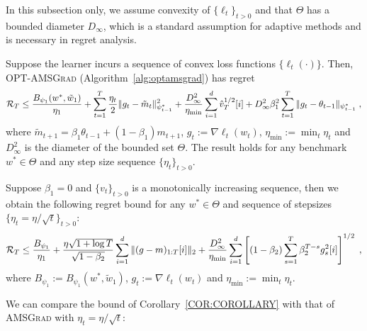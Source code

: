 \documentclass[wcp]{jmlr}
\begin{document}
In this subsection only, we assume convexity of $\{\ell_t\}_{t>0}$ and that $\Theta$ has a bounded diameter $D_{\infty}$, which is a standard assumption for adaptive methods \citep{RKK18,KB15} and is necessary in regret analysis.
\begin{Theorem} \label{THM:MAINCONVEX}\vspace{0.05in}
Suppose the learner incurs a sequence of convex loss functions $\{ \ell_{t}(\cdot) \}$.
Then,  \textsc{OPT-AMSGrad} (Algorithm~\ref{alg:optamsgrad}) has regret 
\begin{equation} \notag
\begin{split}
\mathcal{R}_T \leq    \frac{ B_{\psi_1}(w^*, \tilde{w}_{1})}{\eta_1}
+ \sum_{t=1}^T\frac{\eta_t}{2} \| g_t - \tilde{m}_t  \|_{\psi_{t-1}^*}^2 + \frac{D_{\infty}^2}{\eta_{\min}}  \sum_{i=1}^d \hat{v}_{T}^{1/2}[i] + D_{\infty}^2\beta_1^2   \sum_{t=1}^T  \| g_t - \theta_{t-1}  \|_{\psi_{t-1}^*}\eqsp,
\end{split}
\end{equation}
where $ \tilde{m}_{t+1}  = \beta_1 \theta_{t-1} +(1-\beta_1) m_{t+1}$, $g_{t}:= \nabla \ell_{t}(w_t)$, $\eta_{{\min}} := \min_{{t}} \eta_{t}$ and $D_{\infty}^2$ is the diameter of the bounded set $\Theta$.
The result holds for any benchmark $w^{*} \in \Theta$ and any step size sequence $\{ \eta_t \}_{t>0}$.
\end{Theorem}
\vspace{0.05in}
\begin{Corollary}\label{COR:COROLLARY}
Suppose $\beta_1=0$ and $\{v_t\}_{t>0}$ is a monotonically increasing sequence, then we obtain the following regret bound for any $w^{*} \in \Theta$ and sequence of stepsizes $\{ \eta_t = \eta/\sqrt{t}\}_{t>0}$: 
\begin{equation}\notag
\begin{split}
\mathcal{R}_T \leq  \frac{ B_{\psi_1}}{\eta_1}
+ \frac{\eta \sqrt{1 + \log T}}{\sqrt{1 - \beta_2}} \sum_{i=1}^d \| (g-m)_{1:T}[i] \|_2  +\frac{D_{\infty}^2}{\eta_{\min}} \sum_{i=1}^d \left[ (1-\beta_2) \sum_{s=1}^{T} \beta_2^{T-s} g^2_s[i] \right]^{1/2} \eqsp,
\end{split}
\end{equation}
where $B_{\psi_1} := B_{\psi_1}(w^*, \tilde{w}_{1})$, $g_{t}:= \nabla \ell_{t}(w_t)$ and $\eta_{{\min}} := \min_{{t}} \eta_{t}$.
\end{Corollary}
We can compare the bound of Corollary~\ref{COR:COROLLARY} with that of \textsc{AMSGrad} \citep{RKK18} with $\eta_t = \eta/\sqrt{t}$:
\end{document}
